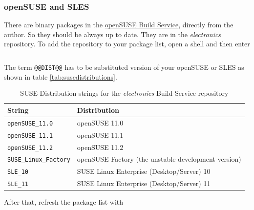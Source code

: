 \documentclass[bibtotoc,UKenglish,halfparskip,oneside,DIV12]{scrreprt}
\begin{document}
\begin{lstlisting}[style=inline]
% sudo usermod -aG plugdev @@USERNAME@@
\end{lstlisting}

\subsubsection{openSUSE and SLES}

There are binary packages in the \href{https://build.opensuse.org/}{openSUSE Build Service},
directly from the author. So they should be always up to date. They are in the \emph{electronics}
repository. To add the repository to your package list, open a shell and then enter

\begin{lstlisting}[style=inline]
% sudo zypper ar -r http://repos.opensuse.org/electronics/@@DIST@@/electronics.repo
\end{lstlisting}

The term \texttt{@@DIST@@} has to be substituted version of your openSUSE or SLES as shown in table
\vref{tab:susedistributions}.

\begin{table}[ht]
  \centering
  \begin{tabular}{|p{4cm}p{10cm}|}
    \hline
    \textbf{String}                 & \textbf{Distribution}                               \\
    \hline
    \hline
    \texttt{openSUSE\_11.0}         & openSUSE 11.0                                       \\
    \texttt{openSUSE\_11.1}         & openSUSE 11.1                                       \\
    \texttt{openSUSE\_11.2}         & openSUSE 11.2                                       \\
    \texttt{SUSE\_Linux\_Factory}   & openSUSE Factory (the unstable development version) \\
    \texttt{SLE\_10}                & SUSE Linux Enterprise (Desktop/Server) 10           \\
    \texttt{SLE\_11}                & SUSE Linux Enterprise (Desktop/Server) 11           \\
    \hline
  \end{tabular}
  \caption{SUSE Distribution strings for the \emph{electronics} Build Service repository}
  \label{tab:susedistributions}
\end{table}

After that, refresh the package list with
\end{document}
